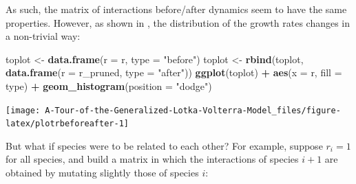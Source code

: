 \documentclass[
]{book}
\newenvironment{Shaded}{\begin{snugshade}}{\end{snugshade}}
\newcommand{\DataTypeTok}[1]{\textcolor[rgb]{0.13,0.29,0.53}{#1}}
\newcommand{\KeywordTok}[1]{\textcolor[rgb]{0.13,0.29,0.53}{\textbf{#1}}}
\newcommand{\NormalTok}[1]{#1}
\newcommand{\OperatorTok}[1]{\textcolor[rgb]{0.81,0.36,0.00}{\textbf{#1}}}
\newcommand{\StringTok}[1]{\textcolor[rgb]{0.31,0.60,0.02}{#1}}
\begin{document}
As such, the matrix of interactions before/after dynamics seem to have the same properties. However, as shown in \citet{servan2018coexistence}, the distribution of the growth rates changes in a non-trivial way:

\begin{Shaded}
\begin{Highlighting}[]
\NormalTok{toplot <-}\StringTok{ }\KeywordTok{data.frame}\NormalTok{(}\DataTypeTok{r =}\NormalTok{ r, }\DataTypeTok{type =} \StringTok{"before"}\NormalTok{)}
\NormalTok{toplot <-}\StringTok{ }\KeywordTok{rbind}\NormalTok{(toplot, }\KeywordTok{data.frame}\NormalTok{(}\DataTypeTok{r =}\NormalTok{ r_pruned, }\DataTypeTok{type =} \StringTok{"after"}\NormalTok{))}
\KeywordTok{ggplot}\NormalTok{(toplot) }\OperatorTok{+}\StringTok{ }\KeywordTok{aes}\NormalTok{(}\DataTypeTok{x =}\NormalTok{ r, }\DataTypeTok{fill =}\NormalTok{ type) }\OperatorTok{+}\StringTok{ }\KeywordTok{geom_histogram}\NormalTok{(}\DataTypeTok{position =} \StringTok{"dodge"}\NormalTok{)}
\end{Highlighting}
\end{Shaded}

\begin{center}\texttt{[image: A-Tour-of-the-Generalized-Lotka-Volterra-Model\_files/figure-latex/plotrbeforeafter-1]} \end{center}

But what if species were to be related to each other? For example, suppose \(r_i = 1\) for all species, and build a matrix in which the interactions of species \(i + 1\) are obtained by mutating slightly those of species \(i\):
\end{document}
